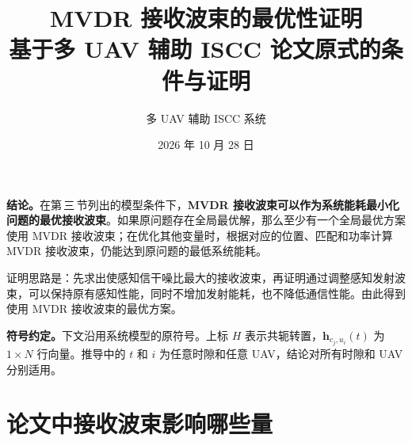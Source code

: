 \documentclass[11pt,a4paper]{ctexart}
\title{\textbf{MVDR 接收波束的最优性证明}\\[4pt]\large 基于多 UAV 辅助 ISCC 论文原式的条件与证明}
\author{多 UAV 辅助 ISCC 系统}
\date{2026 年 10 月 28 日}
\begin{document}
\maketitle
\noindent\textbf{结论。}在第\,三\,节列出的模型条件下，\textbf{MVDR 接收波束可以作为系统能耗最小化问题的最优接收波束}。如果原问题存在全局最优解，那么至少有一个全局最优方案使用 MVDR 接收波束；在优化其他变量时，根据对应的位置、匹配和功率计算 MVDR 接收波束，仍能达到原问题的最低系统能耗。

证明思路是：先求出使感知信干噪比最大的接收波束，再证明通过调整感知发射波束，可以保持原有感知性能，同时不增加发射能耗，也不降低通信性能。由此得到使用 MVDR 接收波束的最优方案。

\noindent\textbf{符号约定。}下文沿用系统模型的原符号。上标 $H$ 表示共轭转置，$\bm h_{c_j,u_i}(t)$ 为 $1\times N$ 行向量。推导中的 $t$ 和 $i$ 为任意时隙和任意 UAV，结论对所有时隙和 UAV 分别适用。
\begingroup\small\tableofcontents\endgroup
\newpage

\section{论文中接收波束影响哪些量}
\end{document}
